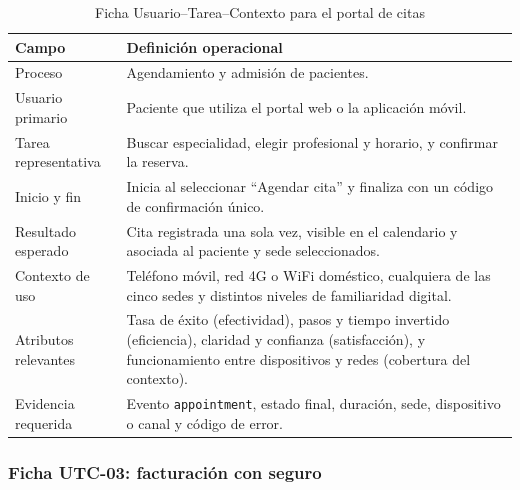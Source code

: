 \begin{table}[H]
\centering
\caption{Ficha Usuario--Tarea--Contexto para el portal de citas}
\label{tab:utc-citas}
\begin{tabularx}{\textwidth}{p{3.5cm}Y}
\toprule
Campo & Definición operacional \\
\midrule
Proceso & Agendamiento y admisión de pacientes. \\
Usuario primario & Paciente que utiliza el portal web o la aplicación móvil. \\
Tarea representativa & Buscar especialidad, elegir profesional y horario, y confirmar la reserva. \\
Inicio y fin & Inicia al seleccionar ``Agendar cita'' y finaliza con un código de confirmación único. \\
Resultado esperado & Cita registrada una sola vez, visible en el calendario y asociada al paciente y sede seleccionados. \\
Contexto de uso & Teléfono móvil, red 4G o WiFi doméstico, cualquiera de las cinco sedes y distintos niveles de familiaridad digital. \\
Atributos relevantes & Tasa de éxito (efectividad), pasos y tiempo invertido (eficiencia), claridad y confianza (satisfacción), y funcionamiento entre dispositivos y redes (cobertura del contexto). \\
Evidencia requerida & Evento \texttt{appointment}, estado final, duración, sede, dispositivo o canal y código de error. \\
\bottomrule
\end{tabularx}
\end{table}

\subsubsection{Ficha UTC-03: facturación con seguro}

